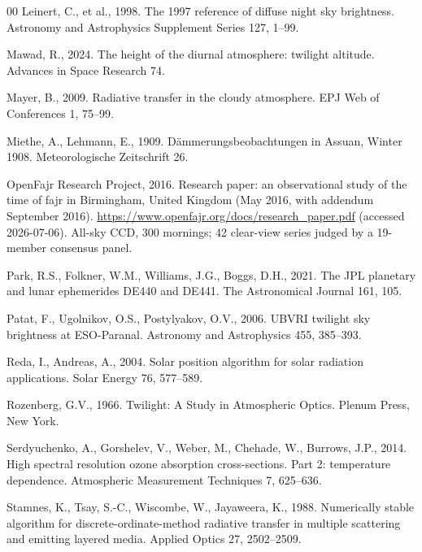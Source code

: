 \documentclass[preprint,12pt]{elsarticle}
\begin{document}
\begin{thebibliography}{00}
Leinert, C., et al., 1998. The 1997 reference of diffuse night sky
brightness. Astronomy and Astrophysics Supplement Series 127, 1--99.

Mawad, R., 2024. The height of the diurnal atmosphere: twilight
altitude. Advances in Space Research 74.

Mayer, B., 2009. Radiative transfer in the cloudy atmosphere. EPJ Web of
Conferences 1, 75--99.

Miethe, A., Lehmann, E., 1909. D\"ammerungsbeobachtungen in Assuan,
Winter 1908. Meteorologische Zeitschrift 26.

OpenFajr Research Project, 2016. Research paper: an observational
study of the time of fajr in Birmingham, United Kingdom (May 2016,
with addendum September 2016).
\url{https://www.openfajr.org/docs/research_paper.pdf} (accessed
2026-07-06). All-sky CCD, 300 mornings; 42 clear-view series judged
by a 19-member consensus panel.

Park, R.S., Folkner, W.M., Williams, J.G., Boggs, D.H., 2021. The JPL
planetary and lunar ephemerides DE440 and DE441. The Astronomical
Journal 161, 105.

Patat, F., Ugolnikov, O.S., Postylyakov, O.V., 2006. UBVRI twilight sky
brightness at ESO-Paranal. Astronomy and Astrophysics 455, 385--393.

Reda, I., Andreas, A., 2004. Solar position algorithm for solar
radiation applications. Solar Energy 76, 577--589.

Rozenberg, G.V., 1966. Twilight: A Study in Atmospheric Optics. Plenum
Press, New York.

Serdyuchenko, A., Gorshelev, V., Weber, M., Chehade, W., Burrows, J.P.,
2014. High spectral resolution ozone absorption cross-sections. Part 2:
temperature dependence. Atmospheric Measurement Techniques 7, 625--636.

Stamnes, K., Tsay, S.-C., Wiscombe, W., Jayaweera, K., 1988. Numerically
stable algorithm for discrete-ordinate-method radiative transfer in
multiple scattering and emitting layered media. Applied Optics 27,
2502--2509.


\end{thebibliography}
\end{document}

